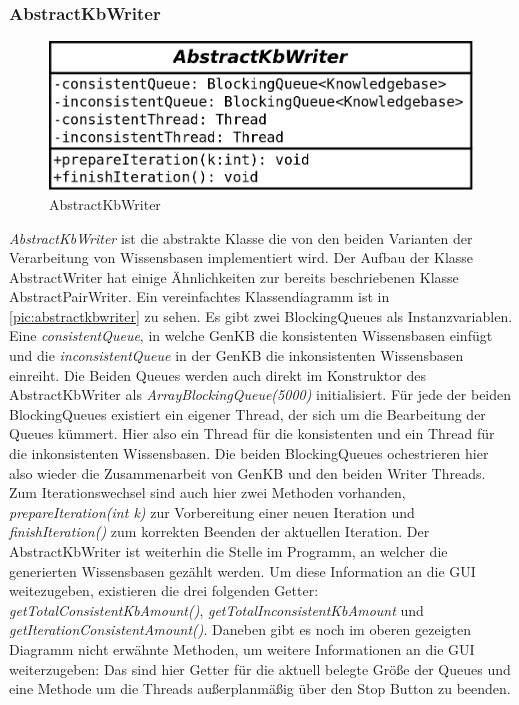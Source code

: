 \documentclass[12pt,a4paper]{article}
\begin{document}
\subsubsection{AbstractKbWriter}

\begin{figure}
\includegraphics[width=0.45\linewidth]{bilder/AbstractKbWriter.png}
\caption{AbstractKbWriter}
\label{pic:abstractkbwriter}
\end{figure}


\textit{AbstractKbWriter} ist die abstrakte Klasse die von den beiden Varianten der Verarbeitung von Wissensbasen implementiert wird. Der Aufbau der Klasse AbstractWriter hat einige Ähnlichkeiten zur bereits beschriebenen Klasse AbstractPairWriter. Ein vereinfachtes Klassendiagramm ist in \autoref{pic:abstractkbwriter} zu sehen. Es gibt zwei BlockingQueues als Instanzvariablen. Eine \textit{consistentQueue}, in welche GenKB die konsistenten Wissensbasen einfügt und die \textit{inconsistentQueue} in der GenKB die inkonsistenten Wissensbasen einreiht. Die Beiden Queues werden auch direkt im Konstruktor des AbstractKbWriter als \textit{ArrayBlockingQueue(5000)} initialisiert. Für jede der beiden BlockingQueues existiert ein eigener Thread, der sich um die Bearbeitung der Queues kümmert. Hier also ein Thread für die konsistenten und ein Thread für die inkonsistenten Wissensbasen. Die beiden BlockingQueues ochestrieren hier also wieder die Zusammenarbeit von GenKB und den beiden Writer Threads. Zum Iterationswechsel sind auch hier zwei Methoden vorhanden, \textit{prepareIteration(int k)} zur Vorbereitung einer neuen Iteration und \textit{finishIteration()} zum korrekten Beenden der aktuellen Iteration. Der AbstractKbWriter ist weiterhin die Stelle im Programm, an welcher die generierten Wissensbasen gezählt werden. Um diese Information an die GUI weitezugeben, existieren die drei folgenden Getter: \textit{getTotalConsistentKbAmount()}, \textit{getTotalInconsistentKbAmount} und \textit{getIterationConsistentAmount()}.
Daneben gibt es noch im  oberen gezeigten Diagramm nicht erwähnte Methoden, um weitere Informationen an die GUI weiterzugeben: Das sind hier Getter für die aktuell belegte Größe der Queues und eine Methode um die Threads außerplanmäßig über den Stop Button zu beenden.
\end{document}
